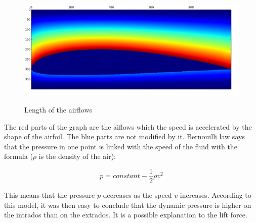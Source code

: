 \documentclass{article}
\begin{document}
\begin{figure}[h]
  \centering
  \caption{Length of the airflows}
  \includegraphics[width=13cm]{boeing_length}
  \label{boeing_length}
\end{figure}

The red parts of the graph are the aiflows which the speed is accelerated by the shape of the airfoil. The blue parts are not modified by it. Bernouilli law says that the pressure in one point is linked with the speed of the fluid with the formula ($\rho$ is the density of the air):

\begin{equation}
  p = constant - \frac{1}{2} \rho v^2
\end{equation}

This means that the pressure $p$ decreases as the speed $v$ increases. According to this model, it was then easy to conclude that the dynamic pressure is higher on the intrados than on the extrados. It is a possible explanation to the lift force.
\end{document}
